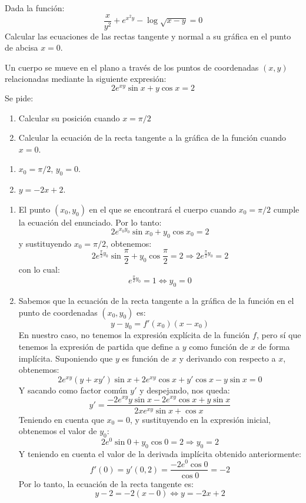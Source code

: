 {Dada la función:
\[
\frac{x}{{y^2 }} + e^{x^2 y}  - \log \sqrt {x - y}  = 0
\]
Calcular las ecuaciones de las rectas tangente y normal a su gráfica en el punto de abcisa $x=0$.
}


{Un cuerpo se mueve en el plano a través de los puntos de coordenadas $(x,y)$ relacionadas mediante la siguiente expresión:
\[
2e^{xy} \sin x + y\cos x = 2
\]
Se pide:
\begin{enumerate}
\item Calcular su posición cuando $x=\pi/2$
\item Calcular la ecuación de la recta tangente a la gráfica de la función cuando $x=0$.
\end{enumerate}
}
{
\begin{enumerate}
\item $x_0=\pi/2$, $y_0 = 0$.
\item $ y=-2x+2$.
\end{enumerate}
}
{\begin{enumerate}
\item El punto $(x_0,y_0)$ en el que se encontrará el cuerpo cuando $x_0=\pi/2$
cumple la ecuación del enunciado. Por lo tanto:
\[
2e^{x_0y_0} \sin x_0 + y_0\cos x_0 = 2
\]
y sustituyendo $x_0=\pi/2$, obtenemos:
\[
2e^{\frac{\pi }{2}y_0 } \sin\frac{\pi }{2} + y_0 \cos \frac{\pi }{2}
= 2 \Rightarrow 2e^{\frac{\pi }{2}y_0 }  = 2
\]
con lo cual:
\[
e^{\frac{\pi }{2}y_0 }  = 1 \Leftrightarrow y_0  = 0
\]

\item Sabemos que la ecuación de la recta tangente a la gráfica de
la función en el punto de coordenadas $(x_0,y_0)$ es:
\[
y-y_0=f'(x_0)(x-x_0)
\]
En nuestro caso, no tenemos la expresión explícita de la función
$f$, pero sí que tenemos la expresión de partida que define a $y$
como función de $x$ de forma implícita. Suponiendo que $y$ es
función de $x$ y derivando con respecto a $x$, obtenemos:
\[
2 e^{xy}(y + xy')\sin x + 2e^{xy}\cos x + y'\cos x - y\sin x = 0
\]
Y sacando como factor común $y'$ y despejando, nos queda:
\[
y' = \frac{{ - 2e^{xy} y \sin x - 2e^{xy} \cos x + y \sin
x}}{{2xe^{xy} \sin x + \cos x}}
\]
Teniendo en cuenta que $x_0=0$, y sustituyendo en la expresión
inicial, obtenemos el valor de $y_0$:
\[
2e^0 \sin 0 + y_0 \cos 0 = 2 \Rightarrow y_0  = 2
\]
Y teniendo en cuenta el valor de la derivada implícita obtenido
anteriormente:
\[
f'(0) = y'(0,2) = \frac{{ - 2e^0 \cos 0}}{{\cos 0}} =  - 2
\]
Por lo tanto, la ecuación de la recta tangente es:
\[
y-2=-2(x-0)\Leftrightarrow y=-2x+2
\]
\end{enumerate}
}


